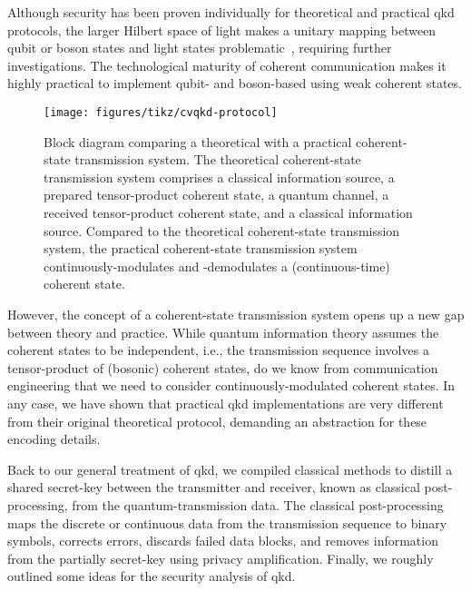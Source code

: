 Although security has been proven individually for theoretical and practical \gls{qkd} protocols, the larger Hilbert space of light makes a unitary mapping between qubit or boson states and light states problematic~\cite{Chefles2000}, requiring further investigations.
The technological maturity of coherent communication makes it highly practical to implement qubit- and boson-based using weak coherent states.
\begin{figure}[htb]
	\centering
	\texttt{[image: figures/tikz/cvqkd-protocol]}
	\caption{Block diagram comparing a theoretical with a practical coherent-state transmission system. The theoretical coherent-state transmission system comprises a classical information source, a prepared tensor-product coherent state, a quantum channel, a received tensor-product coherent state, and a classical information source. Compared to the theoretical coherent-state transmission system, the practical coherent-state transmission system continuously-modulates and -demodulates a (continuous-time) coherent state.}\label{fig:cvqkd_protocol}
\end{figure}
However, the concept of a coherent-state transmission system opens up a new gap between theory and practice.
While quantum information theory assumes the coherent states to be independent, i.e., the transmission sequence involves a tensor-product of (bosonic) coherent states, do we know from communication engineering that we need to consider continuously-modulated coherent states.
In any case, we have shown that practical \gls{qkd} implementations are very different from their original theoretical protocol, demanding an abstraction for these encoding details.

Back to our general treatment of \gls{qkd}, we compiled classical methods to distill a shared secret-key between the transmitter and receiver, known as classical post-processing, from the quantum-transmission data.
The classical post-processing maps the discrete or continuous data from the transmission sequence to binary symbols, corrects errors, discards failed data blocks, and removes information from the partially secret-key using privacy amplification.
Finally, we roughly outlined some ideas for the security analysis of \gls{qkd}.